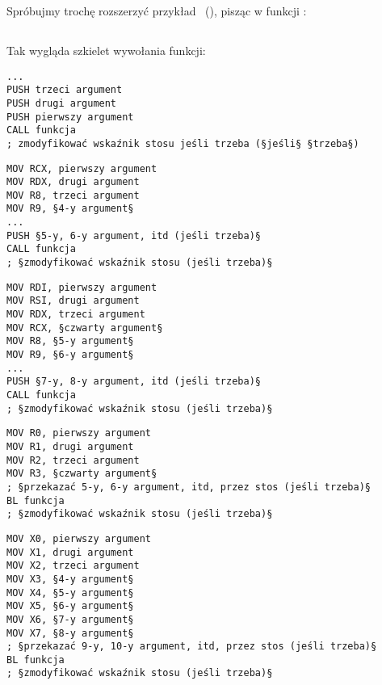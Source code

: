 \mysection{\PrintfSeveralArgumentsSectionName}

Spróbujmy trochę rozszerzyć przykład \IT{\HelloWorldSectionName}~(),
pisząc w funkcji \main:







\subsection{\Conclusion{}}

Tak wygląda szkielet wywołania funkcji:

\begin{lstlisting}[caption=x86,style=customasmx86]
...
PUSH trzeci argument 
PUSH drugi argument
PUSH pierwszy argument
CALL funkcja
; zmodyfikować wskaźnik stosu jeśli trzeba (§jeśli§ §trzeba§)
\end{lstlisting}

\begin{lstlisting}[caption=x64 (MSVC),style=customasmx86]
MOV RCX, pierwszy argument
MOV RDX, drugi argument
MOV R8, trzeci argument
MOV R9, §4-y argument§
...
PUSH §5-y, 6-y argument, itd (jeśli trzeba)§
CALL funkcja
; §zmodyfikować wskaźnik stosu (jeśli trzeba)§
\end{lstlisting}

\begin{lstlisting}[caption=x64 (GCC),style=customasmx86]
MOV RDI, pierwszy argument
MOV RSI, drugi argument
MOV RDX, trzeci argument
MOV RCX, §czwarty argument§
MOV R8, §5-y argument§
MOV R9, §6-y argument§
...
PUSH §7-y, 8-y argument, itd (jeśli trzeba)§
CALL funkcja
; §zmodyfikować wskaźnik stosu (jeśli trzeba)§
\end{lstlisting}

\begin{lstlisting}[caption=ARM,style=customasmARM]
MOV R0, pierwszy argument
MOV R1, drugi argument
MOV R2, trzeci argument
MOV R3, §czwarty argument§
; §przekazać 5-y, 6-y argument, itd, przez stos (jeśli trzeba)§
BL funkcja
; §zmodyfikować wskaźnik stosu (jeśli trzeba)§
\end{lstlisting}

\begin{lstlisting}[caption=ARM64,style=customasmARM]
MOV X0, pierwszy argument
MOV X1, drugi argument
MOV X2, trzeci argument
MOV X3, §4-y argument§
MOV X4, §5-y argument§
MOV X5, §6-y argument§
MOV X6, §7-y argument§
MOV X7, §8-y argument§
; §przekazać 9-y, 10-y argument, itd, przez stos (jeśli trzeba)§
BL funkcja
; §zmodyfikować wskaźnik stosu (jeśli trzeba)§
\end{lstlisting}

